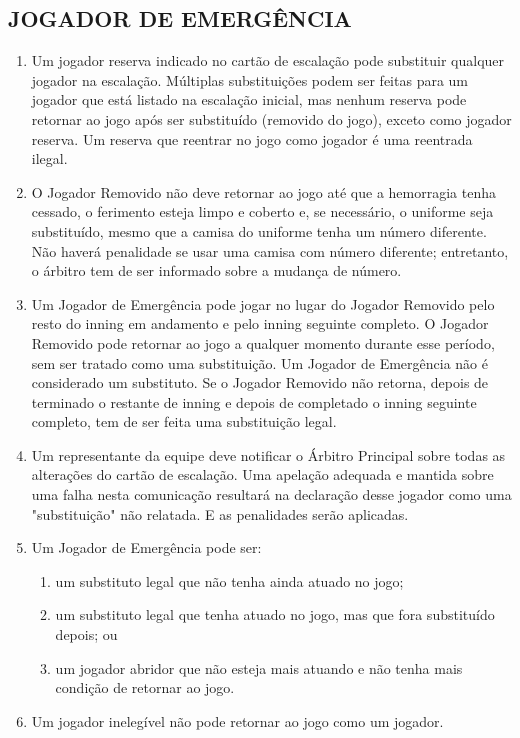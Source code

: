 \subsection{JOGADOR DE EMERGÊNCIA}
\begin{enumerate}[label=(\alph*)]
	\item
	\begin{mdframed}[hidealllines=true,backgroundcolor=blue!20]
		Um jogador reserva indicado no cartão de escalação pode substituir qualquer jogador na escalação. Múltiplas substituições podem ser feitas para um jogador que está listado na escalação inicial, mas nenhum reserva pode retornar ao jogo após ser substituído (removido do jogo), exceto como jogador reserva. Um reserva que reentrar no jogo como jogador é uma reentrada ilegal.
	\end{mdframed}
	\item O Jogador Removido não deve retornar ao jogo até que a hemorragia tenha  cessado, o ferimento esteja limpo e coberto e, se necessário, o uniforme seja substituído, mesmo que a camisa do uniforme tenha um número diferente. Não haverá penalidade se usar uma camisa com número diferente; entretanto, o árbitro tem de ser informado sobre a mudança de número.
	\item Um Jogador de Emergência pode jogar no lugar do Jogador Removido pelo resto do \gls{inning} em andamento e pelo \gls{inning} seguinte completo. O Jogador Removido pode retornar ao jogo a qualquer momento durante esse período, sem ser tratado como uma substituição. Um Jogador de Emergência não é considerado um substituto. Se o Jogador Removido não retorna, depois de terminado o restante de \gls{inning} e depois de completado o \gls{inning} seguinte completo, tem de ser feita uma substituição legal.
	\item \begin{mdframed}[hidealllines=true,backgroundcolor=blue!20]
		Um representante da equipe deve notificar o Árbitro Principal sobre todas as alterações do cartão de escalação. Uma apelação adequada e mantida sobre uma falha nesta comunicação resultará na declaração desse jogador como uma "substituição" não relatada. E as penalidades serão aplicadas.
	\end{mdframed}
	\item Um Jogador de Emergência pode ser:

	\begin{enumerate}[label=\roman*.]
		\item um substituto legal que não tenha ainda atuado no jogo;
		\item um substituto legal que tenha atuado no jogo, mas que fora substituído depois; ou
		\item um jogador abridor que não esteja mais atuando e não tenha mais condição de retornar ao jogo.
	\end{enumerate}
	\item \begin{mdframed}[hidealllines=true,backgroundcolor=blue!20] Um jogador inelegível não pode retornar ao jogo como um jogador.\end{mdframed}
\end{enumerate}

